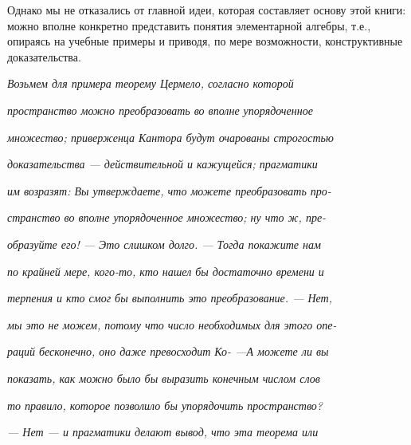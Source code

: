 \documentclass{../../template/mai_book}
\begin{document}
{{   Однако мы не отказались от главной идеи, которая составляет основу этой книги: можно вполне конкретно представить понятия элементарной алгебры, т.е., опираясь на учебные примеры и приводя, по мере возможности, конструктивные доказательства.
   
\hspace{0.8in} \small  \textit {Возьмем для примера теорему Цермело, согласно которой}

\hspace{0.6in} \small  \textit {пространство можно преобразовать во вполне упорядоченное}

\hspace{0.6in} \small  \textit {множество; приверженца Кантора будут очарованы строгостью}

\hspace{0.6in} \small  \textit {доказательства — действительной и кажущейся; прагматики}

\hspace{0.6in} \small  \textit {им возразят: Вы утверждаете, что можете преобразовать про-}
\newpage

\hspace{0.6in} \small \textit {странство во вполне упорядоченное множество; ну что ж, пре-}

\hspace{0.6in} \small  \textit {образуйте его! — Это слишком долго. — Тогда покажите нам }

\hspace{0.6in} \small  \textit {по крайней мере, кого-то, кто нашел бы достаточно времени и }

\hspace{0.6in} \small  \textit {терпения и кто смог бы выполнить это преобразование. — Нет, }

\hspace{0.6in} \small  \textit {мы это не можем, потому что число необходимых для этого опе-}

\hspace{0.6in} \small  \textit {раций бесконечно, оно даже превосходит Ко- —А можете ли вы }

\hspace{0.6in} \small  \textit {показать, как можно было бы выразить конечным числом слов }

\hspace{0.6in} \small  \textit {то правило, которое позволило бы упорядочить пространство?} 

\hspace{0.6in} \small  \textit {— Нет — и прагматики делают вывод, что эта теорема или }

}}
\end{document}
